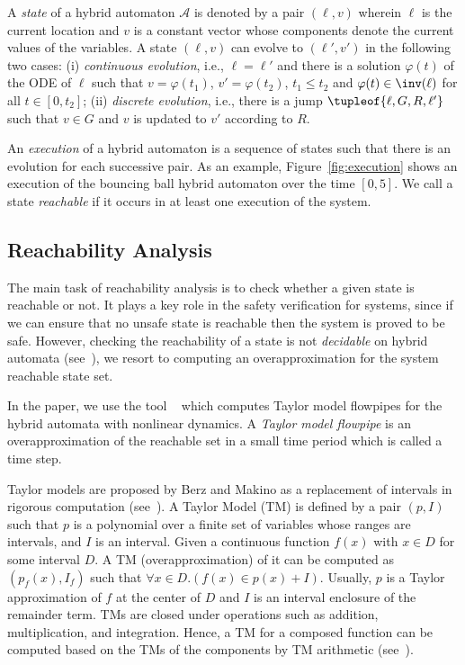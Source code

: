 A \emph{state} of a hybrid automaton $\mathcal{A}$ is denoted by a pair $(\ell, v)$ wherein $\ell$ is the current location and $v$ is a constant vector whose components denote the current values of the variables. A state $(\ell,v)$ can evolve to $(\ell', v')$ in the following two cases: (i) \emph{continuous evolution}, i.e., $\ell = \ell'$ and there is a solution $\varphi(t)$ of the ODE of $\ell$ such that $v = \varphi(t_1)$, $v' = \varphi(t_2)$, $t_1 \leq t_2$ and $\varphi(t) \in \inv(\ell)$ for all $t \in [0,t_2]$; (ii) \emph{discrete evolution}, i.e., there is a jump $\tupleof{\ell, G, R, \ell'}$ such that $v\in G$ and $v$ is updated to $v'$ according to $R$.

An \emph{execution} of a hybrid automaton is a sequence of states such that there is an evolution for each successive pair. As an example, Figure~\ref{fig:execution} shows an execution of the bouncing ball hybrid automaton over the time $[0,5]$. We call a state \emph{reachable} if it occurs in at least one execution of the system.




\subsection{Reachability Analysis}

The main task of reachability analysis is to check whether a given state is reachable or not. It plays a key role in the safety verification for systems, since if we can ensure that no unsafe state is reachable then the system is proved to be safe. However, checking the reachability of a state is not \emph{decidable} on hybrid automata (see~\cite{Alur+/1995/hybrid_systems}), we resort to computing an overapproximation for the system reachable state set.


In the paper, we use the tool \flowstar~\cite{Chen+/2013/flowstar} which computes Taylor model flowpipes for the hybrid automata with nonlinear dynamics. A \emph{Taylor model flowpipe} is an overapproximation of the reachable set in a small time period which is called a time step.


Taylor models are proposed by Berz and Makino as a replacement of intervals in rigorous computation (see~\cite{Berz/1999/Modern,Makino+Berz/2003/Taylor}). A Taylor Model (TM) is defined by a pair $(p,I)$ such that $p$ is a polynomial over a finite set of variables whose ranges are intervals, and $I$ is an interval. Given a continuous function $f(x)$ with $x\in D$ for some interval $D$. A TM (overapproximation) of it can be computed as $(p_f(x), I_f)$ such that $\forall x\in D.(f(x) \in p(x) + I)$. Usually, $p$ is a Taylor approximation of $f$ at the center of $D$ and $I$ is an interval enclosure of the remainder term. TMs are closed under operations such as addition, multiplication, and integration. Hence, a TM for a composed function can be computed based on the TMs of the components by TM arithmetic (see~\cite{Makino+Berz/2003/Taylor}).


